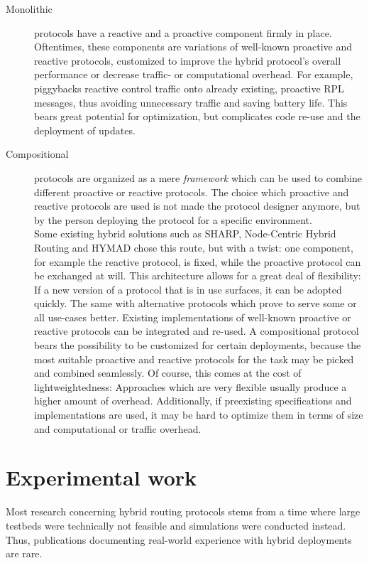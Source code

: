 \documentclass[a4paper,10pt]{scrartcl}
\begin{document}
\begin{description}
\item[Monolithic] protocols have a reactive and a proactive component firmly in place. Oftentimes, these components are variations of well-known proactive and reactive protocols, customized to improve the hybrid protocol's overall performance or decrease traffic- or computational overhead. For example, \cite{baccelli_p2p_rpl} piggybacks reactive control traffic onto already existing, proactive RPL messages, thus avoiding unnecessary traffic and saving battery life. %
This bears great potential for optimization, but complicates code re-use and the deployment of updates.\\
\item[Compositional] protocols are organized as a mere \emph{framework} which can be used to combine different proactive or reactive protocols. 
The choice which proactive and reactive protocols are used is not made the protocol designer anymore, but by the person deploying the protocol for a specific environment.\\
Some existing hybrid solutions such as SHARP, Node-Centric Hybrid Routing and HYMAD chose this route, but with a twist: one component, for example the reactive protocol, is fixed, while the proactive protocol can be exchanged at will. This architecture allows for a great deal of flexibility: If a new version of a protocol that is in use surfaces, it can be adopted quickly. The same with alternative protocols which prove to serve some or all use-cases better. Existing implementations of well-known proactive or reactive protocols can be integrated and re-used.
A compositional protocol bears the possibility to be customized for certain deployments, because the most suitable proactive and reactive protocols for the task may be picked and combined seamlessly.
Of course, this comes at the cost of lightweightedness: Approaches which are very flexible usually produce a higher amount of overhead. Additionally, if preexisting specifications and implementations are used, it may be hard to optimize them in terms of size and computational or traffic overhead.
\end{description}


\section{Experimental work}
\label{sec:experiments}
Most research concerning hybrid routing protocols stems from a time where large testbeds were technically not feasible and simulations were conducted instead. 
Thus, publications documenting real-world experience with hybrid deployments are rare.\\
\end{document}
